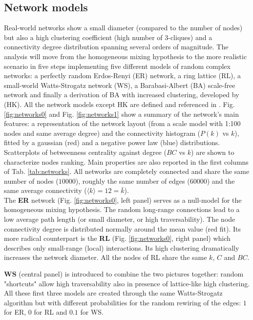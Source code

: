 \documentclass[DIV=12, BCOR=0pt]{scrartcl}  %
\begin{document}
  \subsection{Network models}
  Real-world networks show a small diameter (compared to the number of nodes) but also a high clustering coefficient (high number of 3-cliques) and a connectivity degree distribution spanning several orders of magnitude.
  The analysis will move from the homogeneous mixing hypothesis to the more realistic scenario in five steps implementing five different models of random complex networks: a perfectly random Erdos-Renyi (ER) network, a ring lattice (RL), a small-world Watts-Strogatz network (WS), a Barabasi-Albert (BA) scale-free network and finally a derivation of BA with increased clustering, developed by \citet{Holme} (HK). All the network models except HK are defined and referenced in \citet{PastorSatorras}.
  Fig. \ref{fig:networks0} and Fig. \ref{fig:networks1} show a summary of the network's main features: a representation of the network layout (from a scale model with 1:100 nodes and same average degree) and the connectivity histogram ($P(k)$ vs $k$), fitted by a gaussian (red) and a negative power law (blue) distributions.   
  Scatterplots of betweenness centrality against degree ($BC$ vs $k$) are shown to characterize nodes ranking.  Main properties are also reported in the first columns of Tab. \ref{tab:networks}. All networks are completely connected and share the same number of nodes ($10000$), roughly the same number of edges ($60000$) and the same average connectivity ($\langle k \rangle = 12 = \bar{k}$). \\
  
  The \textbf{ER} network (Fig. \ref{fig:networks0}, left panel) serves as a null-model for the homogeneous mixing hypothesis. The random long-range connections lead to a low average path length (or small diameter, or high traversability). The node connectivity degree is distributed normally around the mean value (red fit). 
  Its more radical counterpart is the \textbf{RL} (Fig. \ref{fig:networks0}, right panel) which describes only small-range (local) interactions. Its high clustering dramatically increases the network diameter. All the nodes of RL share the same $k$, $C$ and $BC$. 
  
  \textbf{WS} (central panel) is introduced to combine the two pictures together: random "shortcuts" allow high traversability also in presence of lattice-like high clustering. All these first three models are created through the same Watts-Strogatz algorithm but with different probabilities for the random rewiring of the edges: $1$ for ER, $0$ for RL and $0.1$ for WS.
  
\end{document}
